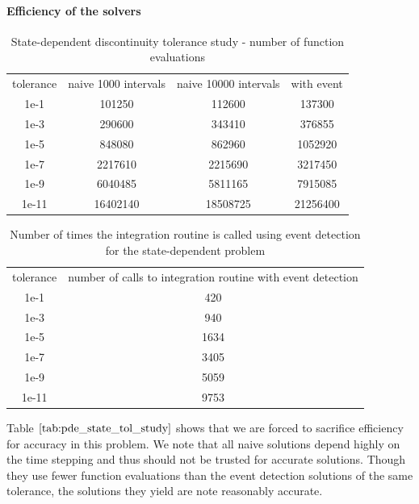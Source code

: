 \documentclass{article}
\begin{document}
\paragraph{Efficiency of the solvers}
\begin{table}[h]
\caption {State-dependent discontinuity tolerance study - number of function evaluations} 
\label{tab:pde_state_tol_study}
\begin{center}
\begin{tabular}{ c c c c } 
tolerance & naive 1000 intervals & naive 10000 intervals & with event \\ 
1e-1      &             101250   &              112600   &   137300 \\
1e-3      &             290600   &              343410   &   376855 \\
1e-5      &             848080   &              862960   &  1052920 \\
1e-7      &            2217610     &           2215690   &  3217450\\
1e-9      &            6040485     &           5811165   &  7915085  \\
1e-11     &           16402140     &          18508725   & 21256400 \\
\end{tabular}
\end{center}
\end{table}

\begin{table}[h]
\caption {Number of times the integration routine is called using event detection for the state-dependent problem} 
\label{tab:pde_state_tol_num_integrations}
\begin{center}
\begin{tabular}{ c c } 
tolerance & number of calls to integration routine with event detection \\ 
1e-1      &    420 \\
1e-3      &    940 \\
1e-5      & 1634 \\
1e-7      & 3405 \\
1e-9      & 5059 \\
1e-11     & 9753 \\
\end{tabular}
\end{center}
\end{table}

Table $\ref{tab:pde_state_tol_study}$ shows that we are forced to sacrifice efficiency for accuracy in this problem. We note that all naive solutions depend highly on the time stepping and thus should not be trusted for accurate solutions. Though they use fewer function evaluations than the event detection solutions of the same tolerance, the solutions they yield are note reasonably accurate. 
\end{document}
